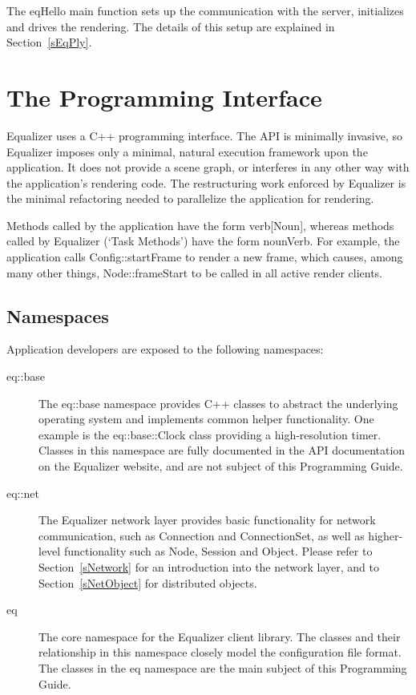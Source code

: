 \documentclass[10pt,a4]{scrartcl}
\newcommand{\sref}[1]{Section~\ref{#1}}
\begin{document}
The \textsf{eqHello} main function sets up the communication with the
server, initializes and drives the rendering. The details of this setup
are explained in \sref{sEqPly}.


\section{The Programming Interface}

Equalizer uses a C++ programming interface. The API is minimally
invasive, so Equalizer imposes only a minimal, natural execution
framework upon the application. It does not provide a scene graph, or
interferes in any other way with the application's rendering code. The
restructuring work enforced by Equalizer is the minimal refactoring
needed to parallelize the application for rendering.

Methods called by the application have the form \textsf{verb[Noun]},
whereas methods called by Equalizer (`Task Methods') have the form
\textsf{nounVerb}. For example, the application calls
\textsf{Config::startFrame} to render a new frame, which causes, among
many other things, \textsf{Node::frameStart} to be called in all active
render clients.

\subsection{\label{sNamespaces}Namespaces}

Application developers are exposed to the following namespaces:

\begin{description}
\item[eq::base] The eq::base namespace provides C++ classes to abstract
  the underlying operating system and implements common helper
  functionality. One example is the \textsf{eq::base::Clock} class
  providing a high-resolution timer. Classes in this namespace are fully
  documented in the API documentation on the Equalizer website, and are
  not subject of this Programming Guide.
\item[eq::net] The Equalizer network layer provides basic functionality
  for network communication, such as \textsf{Connection} and
  \textsf{ConnectionSet}, as well as higher-level functionality such as
  \textsf{Node}, \textsf{Session} and \textsf{Object}. Please refer to
  \sref{sNetwork} for an introduction into the network layer, and to
  \sref{sNetObject} for distributed objects.
\item[eq] The core namespace for the Equalizer client library. The
  classes and their relationship in this namespace closely model the
  configuration file format. The classes in the \textsf{eq} namespace
  are the main subject of this Programming Guide.
\end{description}
\end{document}

